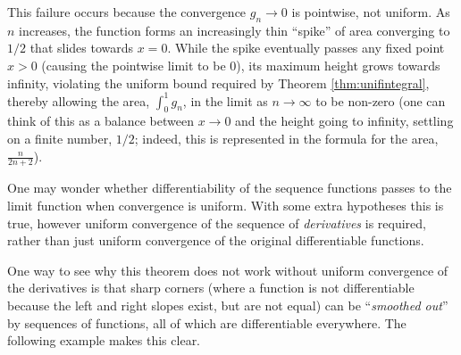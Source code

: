 \documentclass[../analysis1.tex]{subfiles}
\begin{document}
\begin{example}
    This failure occurs because the convergence $g_n \to 0$ is pointwise, not uniform. As $n$ increases, the function forms an increasingly thin ``spike'' of area converging to $1/2$ that slides towards $x=0$. While the spike eventually passes any fixed point $x > 0$ (causing the pointwise limit to be $0$), its maximum height grows towards infinity, violating the uniform bound required by Theorem \ref{thm:unifintegral}, thereby allowing the area, $\int_0^1 g_n$, in the limit as $n\to\infty$ to be non-zero (one can think of this as a balance between $x\to 0$ and the height going to infinity, settling on a finite number, $1/2$; indeed, this is represented in the formula for the area, $\frac{n}{2n+2}$).
\end{example}

One may wonder whether differentiability of the sequence functions passes to the limit function when convergence is uniform. With some extra hypotheses this is true, however uniform convergence of the sequence of \textit{derivatives} is required, rather than just uniform convergence of the original differentiable functions.

One way to see why this theorem does not work without uniform convergence of the derivatives is that sharp corners (where a function is not differentiable because the left and right slopes exist, but are not equal) can be ``\textit{smoothed out}'' by sequences of functions, all of which are differentiable everywhere. The following example makes this clear.
\end{document}
